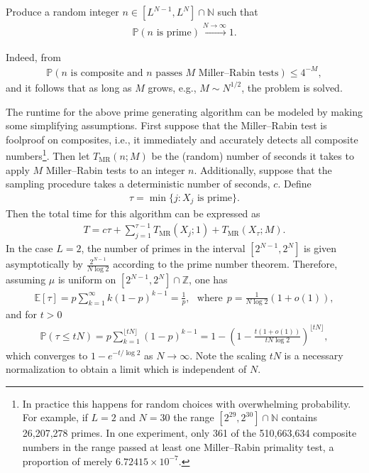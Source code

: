 \documentclass{llncs}
\numberwithin{equation}{section}
\renewcommand\({\left(}
\renewcommand\){\right)}
\begin{document}
  Produce a random integer $n \in [L^{N-1},L^N]\cap \mathbb N$ such that
  \begin{align*}
    \mathbb P( n \text{ is prime} ) \overset{N \to \infty}{\longrightarrow} 1.
  \end{align*}

%
\noindent
  Indeed, from \cite{rabin}
  \begin{align}\label{4M}
    \mathbb P( n \text{ is composite and } n \text{ passes } M \text{ Miller--Rabin tests} ) \leq 4^{-M},
  \end{align}
 and  it follows that as long as $M$ grows, e.g., $M \sim N^{1/2}$, the problem is solved.


The runtime for the above prime generating algorithm can be modeled by making some simplifying assumptions.  First suppose that the Miller--Rabin test is foolproof on composites, i.e., it immediately and accurately detects all composite numbers\footnote{In practice this happens for random choices with overwhelming probability.
For example, if $L =2$ and $N = 30$ the range $[2^{29},2^{30}]\cap \mathbb N$ contains  26,207,278 primes.  In one experiment, only 361 of the 510,663,634 composite numbers in the range passed at least one Miller--Rabin primality test, a proportion of merely
$6.72415 \times 10^{-7}$.
}.  Then let $T_{\mathrm{MR}}(n;M)$ be the (random) number of seconds it takes to apply $M$ Miller--Rabin tests to an integer $n$. Additionally, suppose that the sampling procedure takes a deterministic number of seconds, $c$.  Define
\begin{align*}
  \tau = \min\{j : X_j \text{ is prime}\}.
\end{align*}
Then the total time for this algorithm can be expressed as
\begin{align}\label{eq:T}
  T = c\tau + \sum_{j=1}^{\tau-1} T_{\mathrm{MR}}(X_j;1) + T_{\mathrm{MR}}(X_\tau;M).
\end{align}
In the case $L = 2$,   the number of primes in the interval $[2^{N-1},2^N]$ is given asymptotically by $\frac{2^{N-1}}{N \log 2}$ according to the prime number theorem.  Therefore, assuming $\mu$ is uniform on $[2^{N-1},2^N] \cap \mathbb Z$, one has
\begin{align*}
    \mathbb E[\tau] = p \sum_{k=1}^\infty k (1-p)^{k-1} = \frac{1}{p}, \  \ \ \text{where} \ \  p = \frac{1}{N \log 2 }(1 + o(1)),
\end{align*}
and for $t > 0$
\begin{align*}
    \mathbb P( \tau \leq t N) = p\sum_{k=1}^{\lfloor t N \rfloor} (1 - p)^{k-1} = 1 - \left(1-\frac{t(1 + o(1))}{ tN  \log 2} \right)^{\lfloor t N \rfloor},
\end{align*}
which converges to $1 - e^{- t/\!\log 2}$ as $N\rightarrow\infty$.
Note the scaling $tN$ is a necessary normalization to obtain a limit which is independent of $N$.
\end{document}

